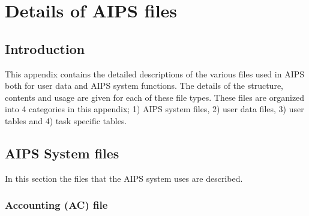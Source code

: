 \setcounter{chapter}{2} %
\chapter{Details of AIPS files}
\setcounter{page}{1}
\section{Introduction }
   This appendix contains the detailed descriptions of the various
files used in AIPS both for user data and AIPS system functions.  The
details of the structure, contents and usage are given for each of
these file types.  These files are organized into 4 categories in
this appendix; 1) AIPS system files, 2) user data files, 3) user
tables and 4) task specific tables.
\section{AIPS System files}
   In this section the files that the AIPS system uses are described.
\subsection{Accounting (AC) file}
